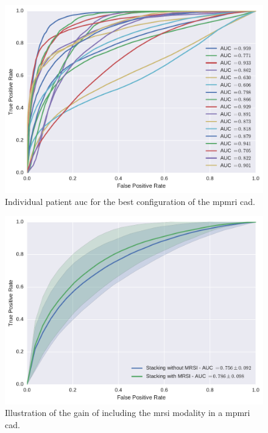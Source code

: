 \begin{figure}
  \centering
  \includegraphics[width=0.7\linewidth]{6_pipeline/figures/exp-5/plot_all_patients.pdf}
  \caption{Individual patient \acs*{auc} for the best configuration of the \acs*{mpmri} \acs*{cad}.}
  \label{fig:indauc}
\end{figure}

\begin{figure}
  \centering
  \includegraphics[width=0.7\linewidth]{6_pipeline/figures/exp-6/stacking_wt_mrsi.pdf}
  \caption{Illustration of the gain of including the \acs*{mrsi} modality in a \acs*{mpmri} \acs*{cad}.}
  \label{fig:resmrsigain}
\end{figure}
